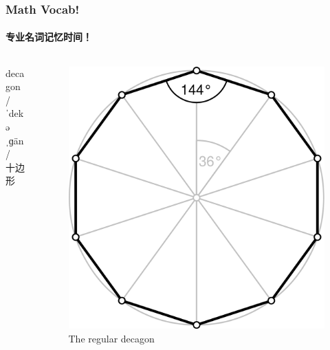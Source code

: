 \documentclass[
	11pt, %
]{beamer}
\begin{document}
\begin{frame}
	\frametitle{Math Vocab!} %
	\framesubtitle{专业名词记忆时间！}
	
	\begin{columns}[t] 
	\begin{column}{0.4\textwidth} %
		{\Huge decagon}\\
		{\LARGE /ˈdekəˌɡän/\\
			\bigskip\bigskip
		十边形}
	\end{column}
	\begin{column}{0.6\textwidth} %
		\begin{figure}
			\includegraphics[width=0.8\linewidth]{decagon.png}
			\caption{The regular decagon}
		\end{figure}	
	\end{column}
\end{columns}
\end{frame}

\end{document}
